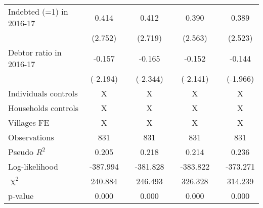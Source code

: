 \begin{table}[htbp]
{\begin{tabular}{lcccccccccccc}
\cmidrule{1-2}\cmidrule{4-5}\cmidrule{7-8}\cmidrule{10-13}    Indebted (=1) in 2016-17 & 0.414 &       & \multicolumn{2}{c}{0.412} &       & \multicolumn{2}{c}{0.390} &       & \multicolumn{4}{c}{0.389} \\
          & (2.752) &       & \multicolumn{2}{c}{(2.719)} &       & \multicolumn{2}{c}{(2.563)} &       & \multicolumn{4}{c}{(2.523)} \\
    Debtor ratio in 2016-17 & -0.157 &       & \multicolumn{2}{c}{-0.165} &       & \multicolumn{2}{c}{-0.152} &       & \multicolumn{4}{c}{-0.144} \\
          & (-2.194) &       & \multicolumn{2}{c}{(-2.344)} &       & \multicolumn{2}{c}{(-2.141)} &       & \multicolumn{4}{c}{(-1.966)} \\
    Individuals controls & X     &       & \multicolumn{2}{c}{X} &       & \multicolumn{2}{c}{X} &       & \multicolumn{4}{c}{X} \\
    Households controls & X     &       & \multicolumn{2}{c}{X} &       & \multicolumn{2}{c}{X} &       & \multicolumn{4}{c}{X} \\
    Villages FE & X     &       & \multicolumn{2}{c}{X} &       & \multicolumn{2}{c}{X} &       & \multicolumn{4}{c}{X} \\
    \midrule
    Observations & 831   &       & \multicolumn{2}{c}{831} &       & \multicolumn{2}{c}{831} &       & \multicolumn{4}{c}{831} \\
    Pseudo $R^2$ & 0.205 &       & \multicolumn{2}{c}{0.218} &       & \multicolumn{2}{c}{0.214} &       & \multicolumn{4}{c}{0.236} \\
    Log-likelihood & -387.994 &       & \multicolumn{2}{c}{-381.828} &       & \multicolumn{2}{c}{-383.822} &       & \multicolumn{4}{c}{-373.271} \\
    $\upchi^2$ & 240.884 &       & \multicolumn{2}{c}{246.493} &       & \multicolumn{2}{c}{326.328} &       & \multicolumn{4}{c}{314.239} \\
    p-value & 0.000 &       & \multicolumn{2}{c}{0.000} &       & \multicolumn{2}{c}{0.000} &       & \multicolumn{4}{c}{0.000} \\
    \bottomrule

    \end{tabular}%
	}
  \label{tab:ame_indebt}%
\end{table}%